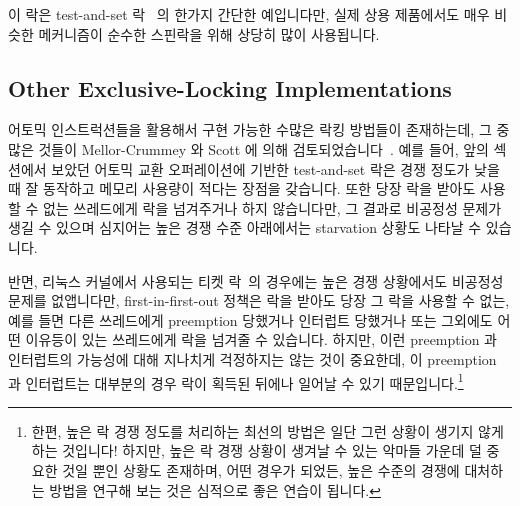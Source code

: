 이 락은 test-and-set 락~\cite{Segall84} 의 한가지 간단한 예입니다만, 실제 상용
제품에서도 매우 비슷한 메커니즘이 순수한 스핀락을 위해 상당히 많이 사용됩니다.

\subsection{Other Exclusive-Locking Implementations}
\label{sec:locking:Other Exclusive-Locking Implementations}

어토믹 인스트럭션들을 활용해서 구현 가능한 수많은 락킹 방법들이 존재하는데, 그
중 많은 것들이 Mellor-Crummey 와 Scott 에 의해
검토되었습니다~\cite{MellorCrummey91a}.
예를 들어, 앞의 섹션에서 보았던 어토믹 교환 오퍼레이션에 기반한 test-and-set
락은 경쟁 정도가 낮을 때 잘 동작하고 메모리 사용량이 적다는 장점을 갖습니다.
또한 당장 락을 받아도 사용할 수 없는 쓰레드에게 락을 넘겨주거나 하지
않습니다만, 그 결과로 비공정성 문제가 생길 수 있으며 심지어는 높은 경쟁 수준
아래에서는 starvation 상황도 나타날 수 있습니다.

반면, 리눅스 커널에서 사용되는 티켓 락~\cite{MellorCrummey91a}의 경우에는 높은
경쟁 상황에서도 비공정성 문제를 없앱니다만, first-in-first-out 정책은 락을
받아도 당장 그 락을 사용할 수 없는, 예를 들면 다른 쓰레드에게 preemption
당했거나 인터럽트 당했거나 또는 그외에도 어떤 이유등이 있는 쓰레드에게 락을
넘겨줄 수 있습니다.
하지만, 이런 preemption 과 인터럽트의 가능성에 대해 지나치게 걱정하지는 않는
것이 중요한데, 이 preemption 과 인터럽트는 대부분의 경우 락이 획득된 뒤에나
일어날 수 있기 때문입니다.\footnote{
	한편, 높은 락 경쟁 정도를 처리하는 최선의 방법은 일단 그런 상황이
	생기지 않게 하는 것입니다!
	하지만, 높은 락 경쟁 상황이 생겨날 수 있는 악마들 가운데 덜 중요한 것일
	뿐인 상황도 존재하며, 어떤 경우가 되었든, 높은 수준의 경쟁에 대처하는
	방법을 연구해 보는 것은 심적으로 좋은 연습이 됩니다.}
\iffalse

